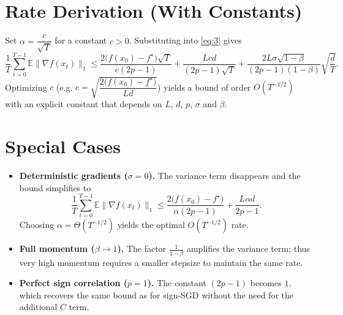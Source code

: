 \documentclass{article}
\begin{document}
\section*{Rate Derivation (With Constants)}
Set $\alpha = \dfrac{c}{\sqrt{T}}$ for a constant $c>0$.  Substituting into \eqref{eq:3} gives
\[
\frac{1}{T}\sum_{t=0}^{T-1}\mathbb{E}\|\nabla f(x_t)\|_{1}
\le
\frac{2\bigl(f(x_0)-f^\star\bigr)\sqrt{T}}{c(2p-1)}
+\frac{L c d}{(2p-1)\sqrt{T}}
+\frac{2L\sigma\sqrt{1-\beta}}{(2p-1)(1-\beta)}\sqrt{\frac{d}{T}} .
\]
Optimizing $c$ (e.g. $c=\sqrt{\dfrac{2\bigl(f(x_0)-f^\star\bigr)}{L d}}$) yields a bound of order $O(T^{-1/2})$ with an explicit constant that depends on $L$, $d$, $p$, $\sigma$ and $\beta$.

\section*{Special Cases}
\begin{itemize}
\item \textbf{Deterministic gradients ($\sigma=0$).} The variance term disappears and the bound simplifies to
\[
\frac{1}{T}\sum_{t=0}^{T-1}\mathbb{E}\|\nabla f(x_t)\|_{1}
\le
\frac{2\bigl(f(x_0)-f^\star\bigr)}{\alpha(2p-1)}
+\frac{L\alpha d}{2p-1}.
\]
Choosing $\alpha = \Theta(T^{-1/2})$ yields the optimal $O(T^{-1/2})$ rate.
\item \textbf{Full momentum ($\beta\to1$).} The factor $\frac{1}{1-\beta}$ amplifies the variance term; thus very high momentum requires a smaller stepsize to maintain the same rate.
\item \textbf{Perfect sign correlation ($p=1$).} The constant $(2p-1)$ becomes $1$, which recovers the same bound as for sign‑SGD without the need for the additional $C$ term.
\end{itemize}
\end{document}

